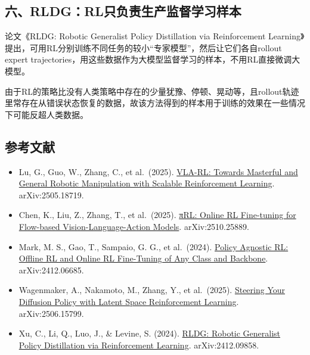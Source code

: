 \hypertarget{ux516drldgrlux53eaux8d1fux8d23ux751fux4ea7ux76d1ux7763ux5b66ux4e60ux6837ux672c}{%
\subsection{六、RLDG：RL只负责生产监督学习样本}\label{ux516drldgrlux53eaux8d1fux8d23ux751fux4ea7ux76d1ux7763ux5b66ux4e60ux6837ux672c}}

论文《RLDG: Robotic Generalist Policy Distillation via Reinforcement Learning》提出，可用RL分别训练不同任务的较小``专家模型''，然后让它们各自rollout expert trajectories，用这些数据作为大模型监督学习的样本，不用RL直接微调大模型。

由于RL的策略比没有人类策略中存在的少量犹豫、停顿、晃动等，且rollout轨迹里常存在从错误状态恢复的数据，故该方法得到的样本用于训练的效果在一些情况下可能反超人类数据。

\hypertarget{ux53c2ux8003ux6587ux732e-153}{%
\subsection{参考文献}\label{ux53c2ux8003ux6587ux732e-153}}

\vspace{0.25em}
\begin{itemize}
\tightlist
\item
  Lu, G., Guo, W., Zhang, C., et al.~(2025). \href{https://arxiv.org/abs/2505.18719}{VLA-RL: Towards Masterful and General Robotic Manipulation with Scalable Reinforcement Learning}. arXiv:2505.18719.
\item
  Chen, K., Liu, Z., Zhang, T., et al.~(2025). \href{https://arxiv.org/abs/2510.25889}{πRL: Online RL Fine-tuning for Flow-based Vision-Language-Action Models}. arXiv:2510.25889.
\item
  Mark, M. S., Gao, T., Sampaio, G. G., et al.~(2024). \href{https://arxiv.org/abs/2412.06685}{Policy Agnostic RL: Offline RL and Online RL Fine-Tuning of Any Class and Backbone}. arXiv:2412.06685.
\item
  Wagenmaker, A., Nakamoto, M., Zhang, Y., et al.~(2025). \href{https://arxiv.org/abs/2506.15799}{Steering Your Diffusion Policy with Latent Space Reinforcement Learning}. arXiv:2506.15799.
\item
  Xu, C., Li, Q., Luo, J., \& Levine, S. (2024). \href{https://arxiv.org/abs/2412.09858}{RLDG: Robotic Generalist Policy Distillation via Reinforcement Learning}. arXiv:2412.09858.
\end{itemize}

\clearpage
